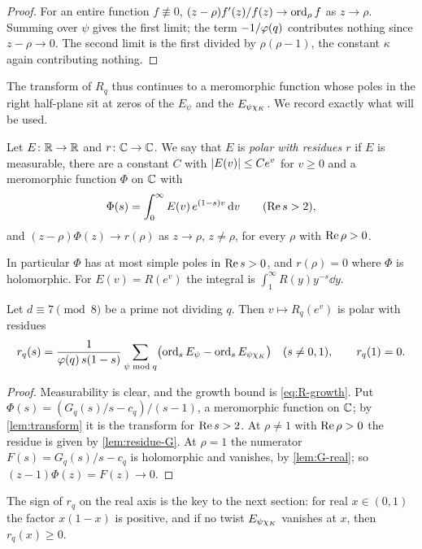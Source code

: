 \begin{proof}
For an entire function $f\not\equiv0$, $(z-\rho)f'(z)/f(z)\to\operatorname{ord}_\rho f$ as $z\to\rho$. Summing over
$\psi$ gives the first limit; the term $-1/\varphi(q)$ contributes nothing since $z-\rho\to0$. The
second limit is the first divided by $\rho(\rho-1)$, the constant $\kappa$ again contributing
nothing.
\end{proof}

The transform of $R_q$ thus continues to a meromorphic function whose poles in the right half-plane
sit at zeros of the $E_\psi$ and the $E_{\psi\chi_K}$. We record exactly what will be used.

\begin{definition}\label{def:polar}
Let $E\colon\mathbb{R}\to\mathbb{R}$ and $r\colon\mathbb{C}\to\mathbb{C}$. We say that $E$ is \emph{polar with residues $r$} if
$E$ is measurable, there are a constant $C$ with $\lvert E(v)\rvert\le Ce^v$ for $v\ge0$ and a meromorphic
function $\Phi$ on $\mathbb{C}$ with
\[
  \Phi(s)=\int_0^\infty E(v)\,e^{(1-s)v}\mathop{}\!\mathrm{d} v\qquad(\operatorname{Re} s>2),
\]
and $(z-\rho)\Phi(z)\to r(\rho)$ as $z\to\rho$, $z\neq\rho$, for every $\rho$ with $\operatorname{Re}\rho>0$.
\end{definition}

In particular $\Phi$ has at most simple poles in $\operatorname{Re} s>0$, and $r(\rho)=0$ where $\Phi$ is
holomorphic. For $E(v)=R(e^v)$ the integral is $\int_1^\infty R(y)y^{-s}\dd y$.

\begin{proposition}\label{prop:polar}
Let $d\equiv7\pmod8$ be a prime not dividing $q$. Then $v\mapsto R_q(e^v)$ is polar with residues
\[
  r_q(s)=\frac{1}{\varphi(q)\,s(1-s)}\sum_{\psi\bmod q}
  \bigl(\operatorname{ord}_s E_\psi-\operatorname{ord}_s E_{\psi\chi_K}\bigr)\quad(s\neq0,1),\qquad r_q(1)=0.
\]
\end{proposition}

\begin{proof}
Measurability is clear, and the growth bound is \eqref{eq:R-growth}. Put
$\Phi(s)=(G_q(s)/s-c_q)/(s-1)$, a meromorphic function on $\mathbb{C}$; by \cref{lem:transform} it is the
transform for $\operatorname{Re} s>2$. At $\rho\ne1$ with $\operatorname{Re}\rho>0$ the residue is given by
\cref{lem:residue-G}. At $\rho=1$ the numerator $F(s)=G_q(s)/s-c_q$ is holomorphic and vanishes, by
\cref{lem:G-real}; so $(z-1)\Phi(z)=F(z)\to0$.
\end{proof}

The sign of $r_q$ on the real axis is the key to the next section: for real $x\in(0,1)$ the factor
$x(1-x)$ is positive, and if no twist $E_{\psi\chi_K}$ vanishes at $x$, then $r_q(x)\ge0$.
